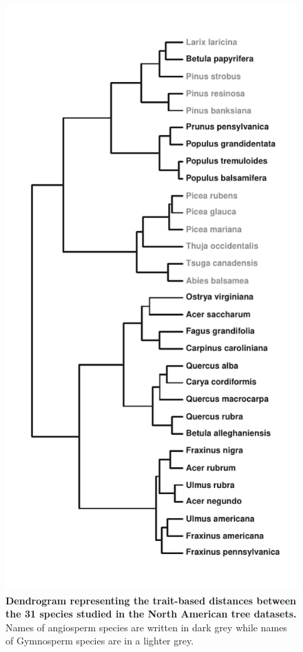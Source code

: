 \begin{figure}[htbp]
\centering
\includegraphics{chapitre3/figS2.pdf}
\caption{\textbf{Dendrogram representing the trait-based distances
between the 31 species studied in the North American tree datasets.}
Names of angiosperm species are written in dark grey while names of
Gymnosperm species are in a lighter grey.\label{fig:dendro}}
\end{figure}

